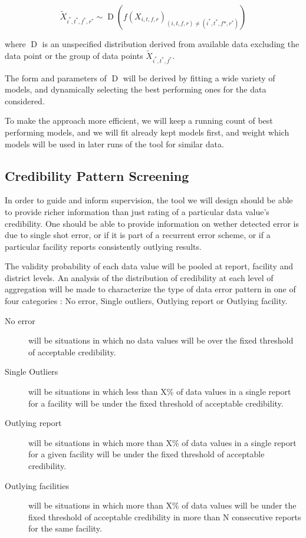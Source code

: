 $$ \widetilde{X}_{i^*,t^*,f^*,r^*} \sim \operatorname{D} \left(f\left(X_{i,t,f,r}\right)_{ \left(i,t,f,r\right) \neq \left(i^*,t^*,f*,r^*\right) } \right) $$

where $\operatorname{D}$ is an unspecified distribution derived from available data excluding the data point or the group of data points $\widetilde{X}_{i^*,t^*,f^*}$.

The form and parameters of $\operatorname{D}$ will be derived by fitting a wide variety of models, and dynamically selecting the best performing ones for the data considered.

To make the approach more efficient, we will keep a running count of best performing models, and we will fit already kept models first, and weight which models will be used in later  runs of the tool for similar data.



\subsection{Credibility Pattern Screening}
\label{paper2_credib_pattern}

In order to guide and inform supervision, the tool we will design should be able to provide richer information than just rating of a particular data value's credibility. One should be able to provide information on wether detected error is due to single shot error, or if it is part of a recurrent error scheme, or if a particular facility reports consistently outlying results.

The validity probability of each data value will be pooled at report, facility and district levels. An analysis of the distribution of credibility at each level of aggregation will be made to characterize the type of data error pattern in one of four categories : No error, Single outliers, Outlying report or Outlying facility.
\begin{description}
	\item[No error] will be situations in which no data values will be over the fixed threshold of acceptable credibility.
	\item[Single Outliers] will be situations in which less than X\% of data values in a single report for a facility will be under the fixed threshold of acceptable credibility.
	\item[Outlying report] will be situations in which more than X\% of data values in a single report for a given facility will be under the fixed threshold of acceptable credibility.
	\item[Outlying facilities] will be situations in which more than X\% of data values will be under the fixed threshold of acceptable credibility in more than N consecutive reports for the same facility.
\end{description}

